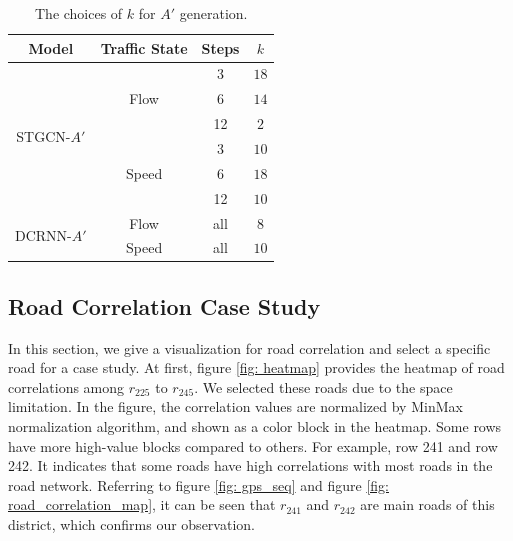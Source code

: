 \begin{table}[htb]
    \renewcommand\arraystretch{1.5} %
    \begin{center}
        \caption{The choices of $k$ for $A'$ generation.}
        \label{k_table}
        \begin{tabular}{c|c|c|c}
            \toprule
  
            \textbf{Model} & \textbf{Traffic State} & \textbf{Steps} & \textbf{$k$}\\
  
            \hline
  
            \multirow{6}{*}{STGCN-$A'$} & \multirow{3}{*}{Flow} & 3 & $18$\\
            ~ & ~ & 6 & $14$\\
            ~ & ~ & 12 & $2$\\
            \cline{2-4}
            ~ & \multirow{3}{*}{Speed} & 3 & $10$\\
            ~ & ~ & 6 & $18$\\
            ~ & ~ & 12 & $10$\\

            \hline

            \multirow{2}{*}{DCRNN-$A'$} & Flow & all & $8$\\
            \cline{2-4}
            ~ & Speed & all & $10$\\
  
            \bottomrule
        \end{tabular}
    \end{center}
\end{table}

\subsection{Road Correlation Case Study}
In this section, we give a visualization for road correlation and select a specific road for a case study. At first, figure \ref{fig: heatmap} provides the heatmap of road correlations among $r_{225}$ to $r_{245}$. We selected these roads due to the space limitation. In the figure, the correlation values are normalized by MinMax normalization algorithm, and shown as a color block in the heatmap. Some rows have more high-value blocks compared to others. For example, row 241 and row 242. It indicates that some roads have high correlations with most roads in the road network. Referring to figure \ref{fig: gps_seq} and figure \ref{fig: road_correlation_map}, it can be seen that $r_{241}$ and $r_{242}$ are main roads of this district, which confirms our observation.

